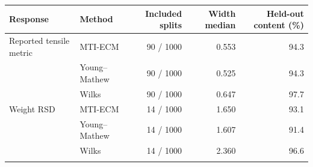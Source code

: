 \begin{tabular}{@{}llrrr@{}}
\toprule
Response & Method & Included splits & Width median & Held-out content (\%)\\
\midrule
Reported tensile metric & MTI-ECM & 90 / 1000 & 0.553 & 94.3 \\
 & Young--Mathew & 90 / 1000 & 0.525 & 94.3 \\
 & Wilks & 90 / 1000 & 0.647 & 97.7 \\
\addlinespace
Weight RSD & MTI-ECM & 14 / 1000 & 1.650 & 93.1 \\
 & Young--Mathew & 14 / 1000 & 1.607 & 91.4 \\
 & Wilks & 14 / 1000 & 2.360 & 96.6 \\
\addlinespace
\bottomrule
\end{tabular}
